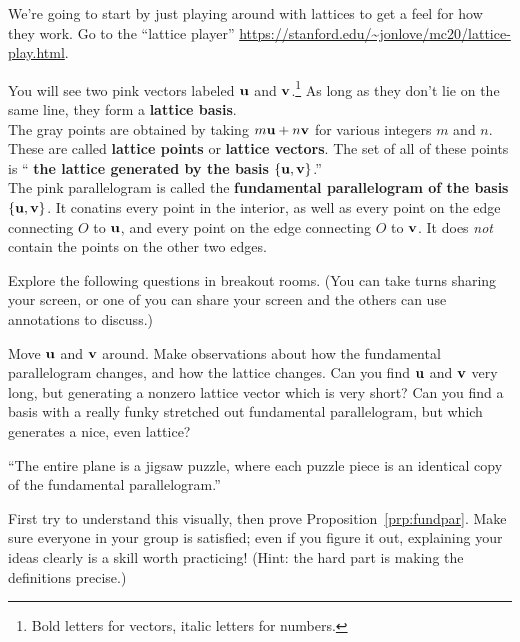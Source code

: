 \noindent
We're going to start by just playing around with lattices to get a feel for how they work. Go to the ``lattice player'' \url{https://stanford.edu/~jonlove/mc20/lattice-play.html}.

\begin{defns}
	You will see two pink vectors labeled {\color{magenta}$\mathbf{u}$} and {\color{magenta}$\mathbf{v}$}.\footnote{Bold letters for vectors, italic letters for numbers.} As long as they don't lie on the same line, they form a \textbf{\color{magenta} lattice basis}.
	\\
	
	The gray points are obtained by taking $m\mathbf{u}+n\mathbf{v}$ for various integers $m$ and $n$. These are called \textbf{\color{gray} lattice points} or \textbf{\color{gray} lattice vectors}. The set of all of these points is ``\textbf{\color{gray} the lattice generated by \color{magenta} the basis $\{\mathbf{u},\mathbf{v}\}$}.''
	\\
	
	The pink parallelogram is called the \textbf{\color{magenta} fundamental parallelogram of the basis $\{\mathbf{u},\mathbf{v}\}$}. It conatins every point in the interior, as well as every point on the edge connecting $O$ to $\mathbf{u}$, and every point on the edge connecting $O$ to $\mathbf{v}$. It does \emph{not} contain the points on the other two edges.
\end{defns}

Explore the following questions in breakout rooms. (You can take turns sharing your screen, or one of you can share your screen and the others can use annotations to discuss.)

\begin{explor}
	Move $\mathbf{u}$ and $\mathbf{v}$ around. Make observations about how the fundamental parallelogram changes, and how the lattice changes.  Can you find $\mathbf{u}$ and $\mathbf{v}$ very long, but generating a nonzero lattice vector which is very short? Can you find a basis with a really funky stretched out fundamental parallelogram, but which generates a nice, even lattice?
\end{explor}

\begin{explor}
	``The entire plane is a jigsaw puzzle, where each puzzle piece is an identical copy of the fundamental parallelogram.'' 
	
	First try to understand this visually, then prove Proposition~\ref{prp:fundpar}. Make sure everyone in your group is satisfied; even if you figure it out, explaining your ideas clearly is a skill worth practicing! \color{DarkGreen}(Hint: the hard part is making the definitions precise.)
\end{explor}

